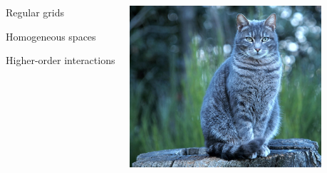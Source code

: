 \documentclass[landscape,a0paper,blockverticalspace = 5mm]{tikzposter}
\begin{document}
\begin{columns}
{{\begin{center}
\begin{minipage}{0.2\linewidth}
		\begin{center}
		Regular grids
	\end{center}		       
      \end{minipage}
      \begin{minipage}{0.1\linewidth}
         \begin{center}	   
	\end{center}
      \end{minipage} 
	\begin{minipage}{0.2\linewidth}
         \begin{center}
		Homogeneous spaces
	\end{center}
      \end{minipage}    
      \begin{minipage}{0.1\linewidth}
         \begin{center}	   
	\end{center}
      \end{minipage} 
	\begin{minipage}{0.2\linewidth}
         \begin{center}
		Higher-order interactions
	\end{center}
      \end{minipage}
      
       \end{center}  
       
       
\begin{center}
		 \begin{minipage}{0.2\linewidth}
		 \begin{center}
		
          \includegraphics[height=6cm]{figures/cat.jpg}
          \vspace{0.5cm}

          \end{center}
      \end{minipage} 
      \begin{minipage}{0.1\linewidth}
      \begin{center}
      

\end{center}
\end{minipage}
\end{center}}}
\end{columns}
\end{document}

